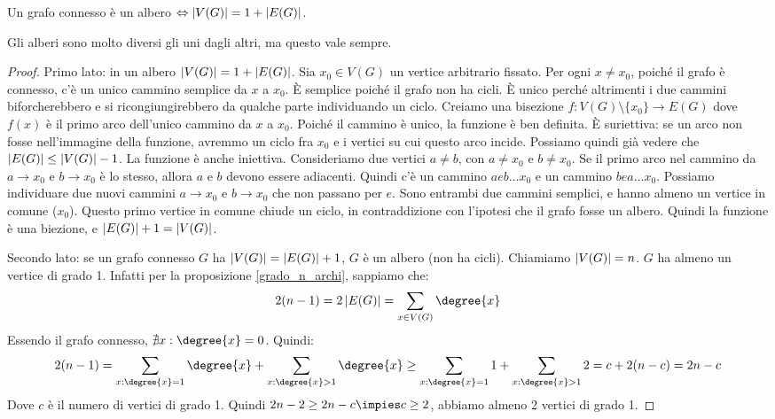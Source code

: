 \begin{prop}
	Un grafo connesso \`e un albero $\Leftrightarrow \left\lvert{V(G)}\right\rvert = 1 + \left\lvert{E(G)}\right\rvert$.
\end{prop}
Gli alberi sono molto diversi gli uni dagli altri, ma questo vale sempre.

\begin{proof}
	Primo lato: in un albero $\left\lvert{V(G)}\right\rvert = 1 + \left\lvert{E(G)}\right\rvert$.
	Sia $x_0 \in V(G)$ un vertice arbitrario fissato.
	Per ogni $x \neq x_0$, poich\'e il grafo \`e connesso, c'\`e un unico cammino semplice da $x$ a $x_0$.
	\`E semplice poich\'e il grafo non ha cicli.
	\`E unico perch\'e altrimenti i due cammini biforcherebbero e si ricongiungirebbero da qualche parte individuando un ciclo.
	Creiamo una bisezione $f: V(G) \setminus \{x_0\} \to E(G)$ dove $f(x)$ \`e il primo arco dell'unico cammino da $x$ a $x_0$.
	Poich\'e il cammino \`e unico, la funzione \`e ben definita.
	\`E suriettiva: se un arco non fosse nell'immagine della funzione, avremmo un ciclo fra $x_0$ e i vertici su cui questo arco incide.
	Possiamo quindi gi\`a vedere che $\left\lvert{E(G)}\right\rvert \le \left\lvert{V(G)}\right\rvert - 1$.
	La funzione \`e anche iniettiva.
	Consideriamo due vertici $a \neq b$, con $a \neq x_0$ e $b \neq x_0$.
	Se il primo arco nel cammino da $a \to x_0$ e $b \to x_0$ \`e lo stesso, allora $a$ e $b$ devono essere adiacenti.
	Quindi c'\`e un cammino $a e b \dots x_0$ e un cammino $b e a \dots x_0$.
	Possiamo individuare due nuovi cammini $a \to x_0$ e $b \to x_0$ che non passano per $e$.
	Sono entrambi due cammini semplici, e hanno almeno un vertice in comune ($x_0$).
	Questo primo vertice in comune chiude un ciclo, in contraddizione con l'ipotesi che il grafo fosse un albero.
	Quindi la funzione \`e una biezione, e $\left\lvert{E(G)}\right\rvert + 1 = \left\lvert{V(G)}\right\rvert$.

	Secondo lato: se un grafo connesso $G$ ha $\left\lvert{V(G)}\right\rvert = \left\lvert{E(G)}\right\rvert + 1$, $G$ \`e un albero (non ha cicli).
	Chiamiamo $\left\lvert{V(G)}\right\rvert = n$.
	$G$ ha almeno un vertice di grado 1.
	Infatti per la proposizione \ref{grado_n_archi}, sappiamo che:
	\[
		2 (n - 1) = 2 \abs{E(G)} = \sum_{x \in V(G)} \degree{x}
	\]
	Essendo il grafo connesso, $\nexists x : \degree{x} = 0$.
	Quindi:
	\begin{align*}
		2 (n-1) =
		\sum_{x : \degree{x} = 1} \degree{x} + \sum_{x : \degree{x} > 1} \degree{x} \ge
		\sum_{x : \degree{x} = 1} 1 + \sum_{x : \degree{x} > 1} 2 =
		c + 2 (n - c) = 2n - c
	\end{align*}
	Dove $c$ \`e il numero di vertici di grado 1.
	Quindi $2n - 2 \ge 2n - c \impies c \ge 2$, abbiamo almeno 2 vertici di grado 1.
	



\end{proof}
